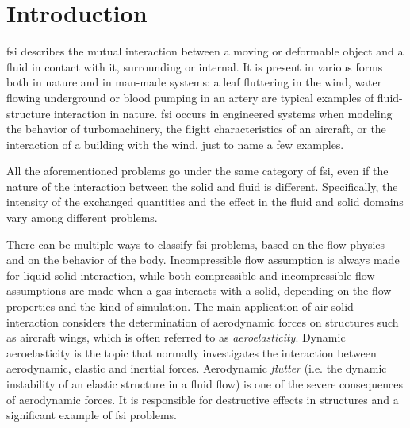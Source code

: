 \chapter{Introduction}
\label{cha:intro}





\acrfull{fsi} describes the mutual interaction between a moving or deformable object and a fluid in contact with it, surrounding or internal. It is present in various forms both in nature and in man-made systems: a leaf fluttering in the wind, water flowing underground or blood pumping in an artery are typical examples of fluid-structure interaction in nature. \acrshort{fsi} occurs in engineered systems when modeling the behavior of turbomachinery, the flight characteristics of an aircraft, or the interaction of a building with the wind, just to name a few examples.

All the aforementioned problems go under the same  category of \acrshort{fsi}, even if the nature of the interaction between the solid and fluid is different. Specifically, the intensity of the exchanged quantities and the effect in the fluid and solid domains vary among different problems.

There can be multiple ways to classify \acrshort{fsi} problems, based on the flow physics and on the behavior of the body. Incompressible flow assumption is always made for liquid-solid interaction, while both compressible and incompressible flow assumptions are made when a gas interacts with a solid, depending on the flow properties and the kind of simulation. The main application of air-solid interaction considers the determination of aerodynamic forces on structures such as aircraft wings, which is often referred to as \textit{aeroelasticity}. Dynamic aeroelasticity is the topic that normally investigates the interaction between aerodynamic, elastic and inertial forces. Aerodynamic \textit{flutter} (i.e. the dynamic instability of an elastic structure in a fluid flow) is one of the severe consequences of aerodynamic forces. It is responsible for destructive effects in structures and a significant example of \acrshort{fsi} problems.

